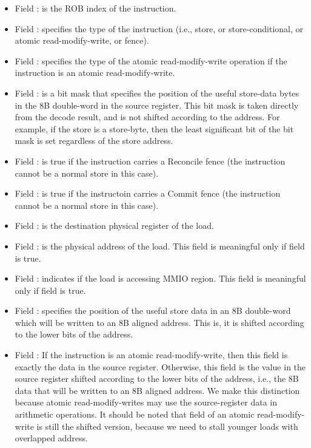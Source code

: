 \begin{itemize}
    \item Field : is the ROB index of the instruction.
    \item Field : specifies the type of the instruction (i.e., store, or store-conditional, or atomic read-modify-write, or fence).
    \item Field : specifies the type of the atomic read-modify-write operation if the instruction is an atomic read-modify-write.
    \item Field : is a bit mask that specifies the position of the useful store-data bytes in the 8B double-word in the source register.
    This bit mask is taken directly from the decode result, and is not shifted according to the address.
    For example, if the store is a store-byte, then the least significant bit of the bit mask is set regardless of the store address.
    \item Field : is true if the instruction carries a Reconcile fence (the instruction cannot be a normal store in this case).
    \item Field : is true if the instructoin carries a Commit fence (the instruction cannot be a normal store in this case).
    \item Field : is the destination physical register of the load.
    \item Field : is the physical address of the load.
    This field is meaningful only if field  is true.
    \item Field : indicates if the load is accessing MMIO region.
    This field is meaningful only if field  is true.
    \item Field : specifies the position of the useful store data in an 8B double-word which will be written to an 8B aligned address.
    This is, it is  shifted according to the lower bits of the address.
    \item Field : If the instruction is an atomic read-modify-write, then this field is exactly the data in the source register.
    Otherwise, this field is the value in the source register shifted according to the lower bits of the address, i.e., the 8B data that will be written to an 8B aligned address.
    We make this distinction because atomic read-modify-writes may use the source-register data in arithmetic operations.
    It should be noted that field  of an atomic read-modify-write is still the shifted version, because we need to stall younger loads with overlapped address.

\end{itemize}
